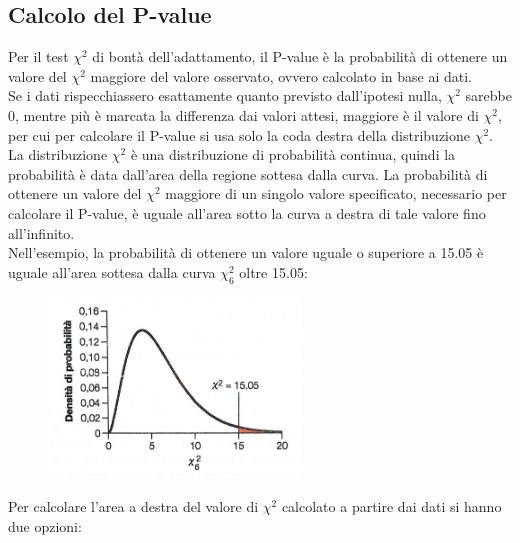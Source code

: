 \documentclass[10pt, draft]{book}
\begin{document}
\subsection{Calcolo del P-value}
Per il test $\chi^2$ di bontà dell'adattamento, il P-value è la probabilità di ottenere un valore del $\chi^2$ maggiore del valore osservato, ovvero calcolato in base ai dati.
\\
Se i dati rispecchiassero esattamente quanto previsto dall'ipotesi nulla, $\chi^2$ sarebbe 0, mentre più è marcata la differenza dai valori attesi, maggiore è il valore di $\chi^2$, per cui per calcolare il P-value si usa solo la coda destra della distribuzione $\chi^2$.
\\
La distribuzione $\chi^2$ è una distribuzione di probabilità continua, quindi la probabilità è data dall'area della regione sottesa dalla curva. La probabilità di ottenere un valore del $\chi^2$ maggiore di un singolo valore specificato, necessario per calcolare il P-value, è uguale all'area sotto la curva a destra di tale valore fino all'infinito.
\\
Nell'esempio, la probabilità di ottenere un valore uguale o superiore a 15.05 è uguale all'area sottesa dalla curva $\chi^2_6$ oltre 15.05:
    \begin{figure}[h]\label{fig8.2-2}
    \centering
    \includegraphics[width=0.6\textwidth]{fig8.2-2}
    \caption{\small{}}
    \end{figure}
Per calcolare l'area a destra del valore di $\chi^2$ calcolato a partire dai dati si hanno due opzioni:
\end{document}
